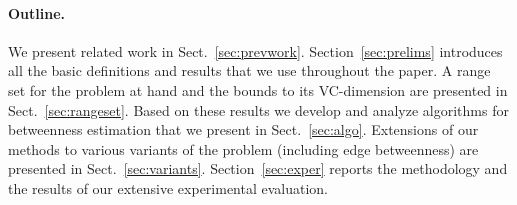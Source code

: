 \paragraph*{Outline\ifdmkd.~\fi} 
 We present related work in Sect.~\ref{sec:prevwork}. Section~\ref{sec:prelims}
introduces all the basic definitions and results that we use throughout the
paper. A range set for the problem at hand and the bounds to its VC-dimension
are presented in Sect.~\ref{sec:rangeset}. Based on these results we develop and
analyze algorithms for betweenness estimation that we present in
Sect.~\ref{sec:algo}. %
\ifproof
Extensions of our methods to various variants of the problem (including edge
betweenness) are presented in Sect.~\ref{sec:variants}. %
\fi 
Section~\ref{sec:exper} reports the methodology and
the results of our extensive experimental evaluation.

